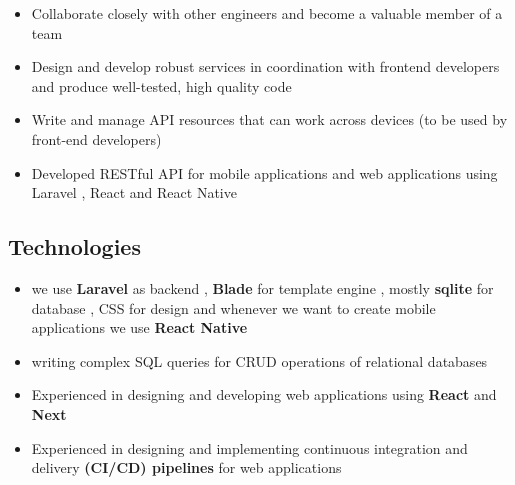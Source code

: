\documentclass[A4,11pt]{article}
\newcommand{\resumeItem}[2]{
  \item{
    \textbf{#1}{: #2 \vspace{-2pt}}
  }
}
\newcommand{\resumeProjectItem}[1]{
  \item{
    { #1 \vspace{-2pt}}
  }
}
\newcommand{\resumeItemListStart}{\begin{itemize}}
\newcommand{\resumeItemListEnd}{\end{itemize}\vspace{-5pt}}
\begin{document}
      \resumeItemListStart
	\resumeProjectItem{Collaborate closely with other engineers and become a valuable member of a team}
	\resumeProjectItem{Design and develop robust services in coordination with frontend developers and produce well-tested, high quality code}
        \resumeProjectItem
          {Write and manage API resources that can work across devices (to be used by front-end developers)}
        \resumeProjectItem
          {Developed RESTful API for mobile applications and web applications using Laravel , React and React Native }

      \resumeItemListEnd

       \vspace{-10pt}
      
      \subsection*{Technologies}
	\vspace{-10pt}
	\resumeItemListStart
        \resumeProjectItem{ we use \textbf{Laravel} as backend ,  \textbf{Blade} for template engine , mostly \textbf{sqlite} for database , CSS for design and whenever we want to create mobile applications we use \textbf{React Native} }
        \resumeProjectItem{ writing complex SQL queries for CRUD operations of relational databases  }
        
	\resumeProjectItem{Experienced in designing and developing web applications using \textbf{React} and \textbf{Next} }
	
\resumeProjectItem{Experienced in designing and implementing continuous integration and delivery \textbf{(CI/CD) pipelines} for web applications}
	
      \resumeItemListEnd

     \vspace{-10pt}
 
\end{document}
